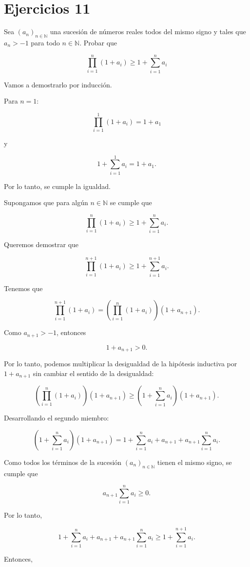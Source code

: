 \section{Ejercicios 11}

\begin{ejercicio}
Sea $(a_n)_{n \in \mathbb{N}}$ una sucesión de números reales todos del mismo signo y tales que $a_n > -1$ para todo $n \in \mathbb{N}$. Probar que

\[
\prod_{i=1}^{n} (1 + a_i) \geq 1 + \sum_{i=1}^{n} a_i
\]

Vamos a demostrarlo por inducción.

Para $n=1$:

\[
\prod_{i=1}^{1}(1+a_i)=1+a_1
\]

y

\[
1+\sum_{i=1}^{1}a_i=1+a_1.
\]

Por lo tanto, se cumple la igualdad.

Supongamos que para algún $n \in \mathbb{N}$ se cumple que

\[
\prod_{i=1}^{n}(1+a_i)
\geq
1+\sum_{i=1}^{n}a_i.
\]

Queremos demostrar que

\[
\prod_{i=1}^{n+1}(1+a_i)
\geq
1+\sum_{i=1}^{n+1}a_i.
\]

Tenemos que

\[
\prod_{i=1}^{n+1}(1+a_i)
=
\left(\prod_{i=1}^{n}(1+a_i)\right)(1+a_{n+1}).
\]

Como $a_{n+1}>-1$, entonces

\[
1+a_{n+1}>0.
\]

Por lo tanto, podemos multiplicar la desigualdad de la hipótesis inductiva por
$1+a_{n+1}$ sin cambiar el sentido de la desigualdad:

\[
\left(\prod_{i=1}^{n}(1+a_i)\right)(1+a_{n+1})
\geq
\left(1+\sum_{i=1}^{n}a_i\right)(1+a_{n+1}).
\]

Desarrollando el segundo miembro:

\[
\left(1+\sum_{i=1}^{n}a_i\right)(1+a_{n+1})
=
1+\sum_{i=1}^{n}a_i+a_{n+1}
+a_{n+1}\sum_{i=1}^{n}a_i.
\]

Como todos los términos de la sucesión $(a_n)_{n\in\mathbb{N}}$
tienen el mismo signo, se cumple que

\[
a_{n+1}\sum_{i=1}^{n}a_i \geq 0.
\]

Por lo tanto,

\[
1+\sum_{i=1}^{n}a_i+a_{n+1}
+a_{n+1}\sum_{i=1}^{n}a_i
\geq
1+\sum_{i=1}^{n+1}a_i.
\]

Entonces,


\end{ejercicio}
